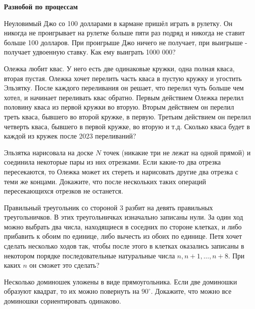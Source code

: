 \centerline{\bf \Huge Разнобой по процессам}

\begin{flushright}
        \scriptsize{}
\end{flushright}

Неуловимый Джо со 100 долларами в кармане пришёл играть в рулетку. Он никогда не проигрывает на рулетке больше пяти раз подряд и никогда не ставит больше 100 долларов. При проигрыше Джо ничего не получает, при выигрыше - получает удвоенную ставку. Как ему выиграть 1000 000?

Олежка любит квас. У него есть две одинаковые кружки, одна полная кваса, вторая пустая. Олежка хочет перелить часть кваса в пустую кружку и угостить Эльзятку. После каждого переливания он решает, что перелил чуть больше чем хотел, и начинает переливать квас обратно. Первым действием Олежка перелил половину кваса из первой кружки во вторую. Вторым действием он перелил треть кваса, бывшего во второй кружке, в первую. Третьим действием он перелил четверть кваса, бывшего в первой кружке, во вторую и т.д. Сколько кваса будет в каждой из кружек после 2023 переливаний?

Эльзятка нарисовала на доске $N$ точек (никакие три не лежат на одной прямой) и соединила некоторые пары из них отрезками. Если какие-то два отрезка пересекаются, то Олежка может их стереть и нарисовать другие два отрезка с теми же концами. Докажите, что после нескольких таких операций пересекающихся отрезков не останется.

Правильный треугольник со стороной 3 разбит на девять правильных треугольничков. В этих треугольничках изначально записаны нули. За один ход можно выбрать два числа, находящиеся в соседних по стороне клетках, и либо прибавить к обоим по единице, либо вычесть из обоих по единице. Петя хочет сделать несколько ходов так, чтобы после этого в клетках оказались записаны в некотором порядке последовательные натуральные числа $n, n+1, \ldots, n+8$. При каких $n$ он сможет это сделать?

Несколько доминошек уложены в виде прямоугольника. Если две доминошки образуют квадрат, то их можно повернуть на $90^{\circ}$. Докажите, что можно все доминошки сориентировать одинаково.